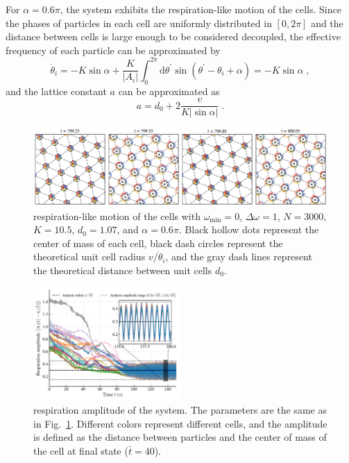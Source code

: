 \documentclass{article}
\begin{document}
For $\alpha=0.6\pi$, the system exhibits the respiration-like motion of the cells. Since the phases of particles in each cell are uniformly distributed in $[0, 2\pi]$ and the distance between cells is large enough to be considered decoupled, the effective frequency of each particle can be approximated by
\begin{equation}
    \dot{\theta}_i=-K\sin \alpha +\frac{K}{\left| A_i \right|}\int_0^{2\pi}{\mathrm{d}\theta ^{\prime}\sin \left( \theta ^{\prime}-\theta _i+\alpha \right)}=-K\sin \alpha\;,
\end{equation}
and the lattice constant $a$ can be approximated as 
\begin{equation}
    a=d_0+2\frac{v}{K\left| \sin \alpha \right|}\;.
    \label{eq:latticeConstant}
\end{equation}
\begin{figure}[H]
    \centering
    \includegraphics[width=\textwidth]{./figs/respiration_snapshot.pdf}
    \caption{
        \label{fig:respiration_snapshot}
        respiration-like motion of the cells with $\omega _{\min}=0$, $\Delta \omega=1$, $N=3000$, $K=10.5$, $d_0=1.07$, and $\alpha=0.6\pi$. Black hollow dots represent the center of mass of each cell, black dash circles represent the theoretical unit cell radius $v/\dot{\theta}_i$, and the gray dash lines represent the theoretical distance between unit cells $d_0$.
    }
\end{figure}
\begin{figure}[H]
    \centering
    \includegraphics[width=0.5\textwidth]{./figs/respiration_amplitude_inset.pdf}
    \caption{
        \label{fig:respiration_amplitude}
        respiration amplitude of the system. 
        The parameters are the same as in Fig.~\ref{fig:respiration_snapshot}.
        Different colors represent different cells, and the amplitude is defined as the distance between particles and the center of mass of the cell at final state ($\bar{t}=40$).
    }
\end{figure}
\end{document}

